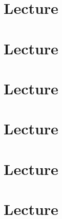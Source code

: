 \documentclass{easyclass}
\begin{document}
\chapter{Lecture}


\chapter{Lecture}


\chapter{Lecture}


\chapter{Lecture}


\chapter{Lecture}


\chapter{Lecture}



%
\end{document}
